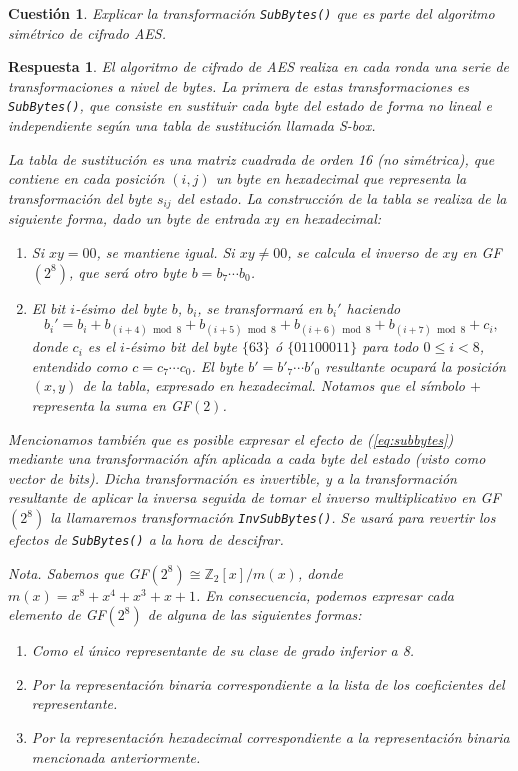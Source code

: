 \documentclass[
  a4paper,
  spanish,
  12pt,
]{scrartcl}
\theoremstyle{ejercicio-style}
\newtheorem{ejer}{Cuestión}
\theoremstyle{remark-style}
\newtheorem*{sol}{Respuesta}
\theoremstyle{teorema-style}
\begin{document}
\begin{ejer}
  Explicar la transformación \texttt{SubBytes()} que es parte del algoritmo simétrico de cifrado AES.
\end{ejer}

\begin{sol}
El algoritmo de cifrado de AES realiza en cada ronda una serie de transformaciones a nivel de bytes. La primera de estas transformaciones es \texttt{SubBytes()}, que consiste en sustituir cada byte del estado de forma no lineal e independiente según una tabla de sustitución llamada S-box.

La tabla de sustitución es una matriz cuadrada de orden 16 (no simétrica), que contiene en cada posición $(i,j)$ un byte en hexadecimal que representa la transformación del byte $s_{ij}$ del estado. La construcción de la tabla se realiza de la siguiente forma, dado un byte de entrada $xy$ en hexadecimal:

\begin{enumerate}
\item Si $xy = 00$, se mantiene igual. Si $xy \neq 00$, se calcula el inverso de $xy$ en GF$(2^8)$, que será otro byte $b = b_7\cdots b_0$.
\item El bit $i$-ésimo del byte $b$, $b_i$, se transformará en $b_i'$ haciendo
\begin{equation}
  \label{eq:subbytes}
  b_i' = b_i + b_{(i+4)\bmod 8} + b_{(i+5)\bmod 8} + b_{(i+6)\bmod 8} + b_{(i+7)\bmod 8} + c_i,
\end{equation}
donde $c_i$ es el $i$-ésimo bit del byte $\{63\}$ ó $\{01100011\}$ para todo $0 \leq i < 8$, entendido como $c=c_7\cdots c_0$. El byte $b' = b'_7\cdots b'_0$ resultante ocupará la posición $(x,y)$ de la tabla, expresado en hexadecimal. Notamos que el símbolo $+$ representa la suma en GF$(2)$.

\end{enumerate}

Mencionamos también que es posible expresar el efecto de (\ref{eq:subbytes}) mediante una transformación afín aplicada a cada byte del estado (visto como vector de bits). Dicha transformación es invertible, y a la transformación resultante de aplicar la inversa seguida de tomar el inverso multiplicativo en GF$(2^8)$ la llamaremos transformación \texttt{InvSubBytes()}. Se usará para revertir los efectos de \texttt{SubBytes()} a la hora de descifrar.

\textit{Nota.} Sabemos que GF$(2^8) \cong \mathbb Z_2[x] /m(x)$, donde $m(x) = x^8 + x^4 + x^3 + x + 1$. En consecuencia, podemos expresar cada elemento de GF$(2^8)$ de alguna de las siguientes formas:
\begin{enumerate}
  \item Como el único representante de su clase de grado inferior a 8.
  \item Por la representación binaria correspondiente a la lista de los coeficientes del representante.
  \item Por la representación hexadecimal correspondiente a la representación binaria mencionada anteriormente.
\end{enumerate}
\end{sol}
\end{document}
